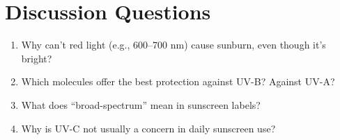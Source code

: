 \documentclass[12pt]{article}
\begin{document}
\section*{Discussion Questions}

\begin{enumerate}
    \item Why can't red light (e.g., 600–700 nm) cause sunburn, even though it's bright?
    \item Which molecules offer the best protection against UV-B? Against UV-A?
    \item What does “broad-spectrum” mean in sunscreen labels?
    \item Why is UV-C not usually a concern in daily sunscreen use?
\end{enumerate}
\end{document}
